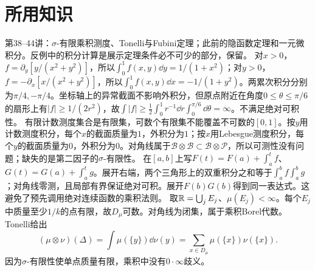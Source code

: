 \documentclass[UTF8,fontset=fandol,11pt]{ctexart}
\begin{document}
\section*{所用知识}
第38--44讲：$\sigma$-有限乘积测度、Tonelli与Fubini定理；此前的隐函数定理和一元微积分。反例中的积分计算是展示定理条件必不可少的部分，保留。
对$x>0$，$f=\partial_y[y/(x^2+y^2)]$，所以$\int_0^1f(x,y)\dd y=1/(1+x^2)$；对$y>0$，$f=-\partial_x[x/(x^2+y^2)]$，所以$\int_0^1f(x,y)\dd x=-1/(1+y^2)$。两累次积分分别为$\pi/4,-\pi/4$。坐标轴上的异常截面不影响外积分，但原点附近在角度$0\le\theta\le\pi/6$的扇形上有$|f|\ge1/(2r^2)$，故$\int|f|\ge\frac12\int_0^1r^{-1}\dd r\int_0^{\pi/6}\dd\theta=\infty$。不满足绝对可积性。
有限计数测度集合是有限集，可数个有限集不能覆盖不可数的$[0,1]$。按$y$用计数测度积分，每个$x$的截面质量为$1$，外积分为$1$；按$x$用Lebesgue测度积分，每个$y$的截面质量为$0$，外积分为$0$。对角线属于$\mathcal B\otimes\mathcal B\subset\mathcal B\otimes\mathcal P$，所以可测性没有问题；缺失的是第二因子的$\sigma$-有限性。
在$[a,b]$上写$F(t)=F(a)+\int_a^tf$、$G(t)=G(a)+\int_a^tg$。展开右端，两个三角形上的双重积分之和等于$\int_a^bf\int_a^bg$；对角线零测，且局部有界保证绝对可积。展开$F(b)G(b)$得到同一表达式。这避免了预先调用绝对连续函数的乘积法则。
取$\mathbb R=\bigcup_jE_j$、$\mu(E_j)<\infty$。每个$E_j$中质量至少$1/k$的点有限，故$D_\mu$可数。对角线为闭集，属于乘积Borel代数。Tonelli给出
\[(\mu\otimes\nu)(\Delta)=\int\mu(\{y\})\dd\nu(y)=\sum_{x\in D_\mu}\mu(\{x\})\nu(\{x\}).\]
因为$\sigma$-有限性使单点质量有限，乘积中没有$0\cdot\infty$歧义。
\end{document}
